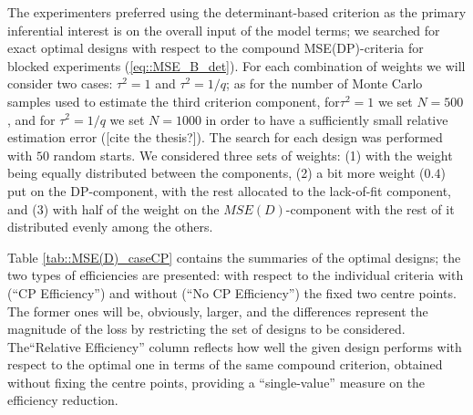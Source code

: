 The experimenters preferred using the determinant-based criterion  as the primary inferential interest is on the overall input of the model terms; we searched for exact optimal designs with respect to the compound MSE(DP)-criteria for blocked experiments (\ref{eq::MSE_B_det}). For each combination of weights we will consider two cases: $\tau^2=1$ and $\tau^2=1/q$; as for the number of Monte Carlo samples used to estimate the third criterion component, for$\tau^2=1$ we set $N=500$, and for $\tau^2=1/q$ we set $N=1000$ in order to have a sufficiently small relative estimation error ([cite the thesis?]). The search for each design was performed with $50$ random starts.
We considered three sets of weights: (1) with the weight being equally distributed between the components, (2) a bit more weight ($0.4$) put on the DP-component, with the rest allocated to the lack-of-fit component, and (3) with half of the weight on the $MSE(D)$-component with the rest of it distributed evenly among the others. 

Table \ref{tab::MSE(D)_caseCP} contains the summaries of the optimal designs; the two types of efficiencies are presented: with respect to the individual criteria with (``CP Efficiency'') and without (``No CP Efficiency'') the fixed two centre points. The former ones will be, obviously, larger, and the differences represent the magnitude of the loss by restricting the set of designs to be considered. The``Relative Efficiency'' column reflects how well the given design performs with respect to the optimal one in terms of the same compound criterion, obtained without fixing the centre points, providing a ``single-value'' measure on the efficiency reduction.  


